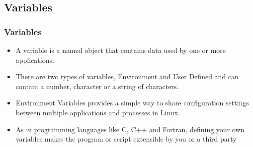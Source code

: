 \documentclass[10pt,t]{beamer}
\begin{document}
\subsection{Variables}
\begin{frame}
  \frametitle{Variables}
  \begin{itemize}
    \item A variable is a named object that contains data used by one or more applications. 
    \item There are two types of variables, Environment and User Defined and can contain  a number, character or a string of characters.
    \item Environment Variables provides a simple way to share configuration settings between multiple applications and processes in Linux.
    \item As in programming languages like C, C++ and Fortran, defining your own variables makes the program or script extensible by you or a third party

\end{itemize}
\end{frame}
\end{document}
